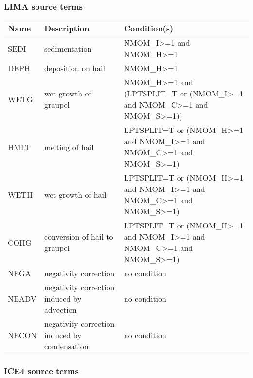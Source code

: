 \subsubsection{LIMA source terms}

\begin{longtable} {|p{}|p{}|p{}|}
\hline
Name & Description & Condition(s) \\
\hline \hline
\endhead
SEDI   & sedimentation                                 & NMOM\_I>=1 and NMOM\_H>=1 \\\hline
DEPH   & deposition on hail                            & NMOM\_H>=1 \\\hline
WETG   & wet growth of graupel                         & NMOM\_H>=1 and (LPTSPLIT=T or (NMOM\_I>=1 and NMOM\_C>=1 and NMOM\_S>=1)) \\\hline
HMLT   & melting of hail                               & LPTSPLIT=T or (NMOM\_H>=1 and NMOM\_I>=1 and NMOM\_C>=1 and NMOM\_S>=1) \\\hline
WETH   & wet growth of hail                            & LPTSPLIT=T or (NMOM\_H>=1 and NMOM\_I>=1 and NMOM\_C>=1 and NMOM\_S>=1) \\\hline
COHG   & conversion of hail to graupel                 & LPTSPLIT=T or (NMOM\_H>=1 and NMOM\_I>=1 and NMOM\_C>=1 and NMOM\_S>=1) \\\hline
NEGA   & negativity correction                         & no condition \\\hline
NEADV  & negativity correction induced by advection    & no condition \\\hline
NECON  & negativity correction induced by condensation & no condition \\\hline
\end{longtable}

\subsubsection{ICE4 source terms}

